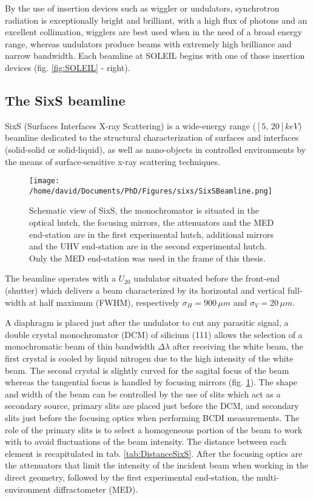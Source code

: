 By the use of insertion devices such as wiggler or undulators, synchrotron radiation is exceptionally bright and brilliant, with a high flux of photons and an excellent collimation, wigglers are best used when in the need of a broad energy range, whereas undulators produce beams with extremely high brilliance and narrow bandwidth.
Each beamline at SOLEIL begins with one of those insertion devices (fig. \ref{fig:SOLEIL} - right).

\subsection{The SixS beamline}

SixS (Surfaces Interfaces X-ray Scattering) is a wide-energy range ($[5, \, 20] keV$) beamline dedicated to the structural characterization of surfaces and interfaces (solid-solid or solid-liquid), as well as nano-objects in controlled environments by the means of surface-sensitive x-ray scattering techniques.

\begin{figure}[!htb]
    \centering
    \texttt{[image: /home/david/Documents/PhD/Figures/sixs/SixSBeamline.png]}
    \caption{
		Schematic view of SixS, the monochromator is situated in the optical hutch, the focusing mirrors, the attenuators and the MED end-station are in the first experimental hutch, additional mirrors and the UHV end-station are in the second experimental hutch.
		Only the MED end-station was used in the frame of this thesis.
    }
    \label{fig:SixSBeamline}
\end{figure}

The beamline operates with a $U_{20}$ undulator situated before the front-end (shutter) which delivers a beam characterized by its horizontal and vertical full-width at half maximum (FWHM), respectively $\sigma_H = 900 \, \mu m$ and $\sigma_V = 20 \, \mu m$.

A diaphragm is placed just after the undulator to cut any parasitic signal, a double crystal monochromator (DCM) of silicium (111) allows the selection of a monochromatic beam of thin bandwidth $\Delta \lambda$ after receiving the white beam, the first crystal is cooled by liquid nitrogen due to the high intensity of the white beam.
The second crystal is slightly curved for the sagital focus of the beam whereas the tangential focus is handled by focusing mirrors (fig. \ref{fig:SixSBeamline}).
The shape and width of the beam can be controlled by the use of slits which act as a secondary source, primary slits are placed just before the DCM, and secondary slits just before the focusing optics when performing BCDI measurements.
The role of the primary slits is to select a homogeneous portion of the beam to work with to avoid fluctuations of the beam intensity.
The distance between each element is recapitulated in tab. \ref{tab:DistanceSixS}.
After the focusing optics are the attenuators that limit the intensity of the incident beam when working in the direct geometry, followed by the first experimental end-station, the multi-environment diffractometer (MED).

